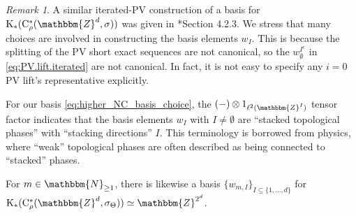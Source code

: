 \documentclass{amsart}
\numberwithin{figure}{section}
\numberwithin{equation}{section}
\numberwithin{table}{section}
\theoremstyle{plain}
\theoremstyle{definition}
\theoremstyle{remark}
\newtheorem{remark}[equation]{Remark}
\theoremstyle{nonumber}
\newcommand{\N}{\mathbb{N}}
\newcommand{\Z}{\mathbb{Z}}
\newcommand{\K}{\relax\ifmmode\operatorname{K}\else\textup{K}\fi}
\newcommand{\Cst}{\relax\ifmmode\mathrm{C}^*\else\textup{C*}\fi}
\newcommand{\Cstr}{\Cst_\rho} %
\newcommand{\blank}{-}
\renewcommand{\mathbb}{\mathbbm} %
\begin{document}
\begin{remark}
A similar iterated-PV construction of a basis for
$\K_*(\Cstr(\Z^d,\sigma))$ was given in
\cite{Prodan-SBaldes:Complex_topological_insulators}*{Section 4.2.3}. We stress that many choices are involved in constructing the basis elements $w_I$. This is because the splitting of the PV short exact sequences are not canonical, so the $w_\emptyset^{I^\mathrm{c}}$ in \eqref{eq:PV.lift.iterated} are not canonical. In fact, it is not easy to specify any $i=0$ PV lift's representative explicitly.

For our basis \eqref{eq:higher_NC_basis_choice}, the $(\blank)\otimes
1_{\ell^2(\Z^I)}$ tensor factor indicates that the basis elements $w_I$
with $I\neq \emptyset$ are ``stacked topological phases'' with ``stacking
directions'' $I$. This terminology is borrowed from physics, where ``weak''
topological phases are often described as being connected to ``stacked''
phases.
\end{remark}


For $m\in\N_{\geq 1}$, there is likewise a basis $\{w_{m,I}\}_{I\subseteq\{1,\ldots,d\}}$ for $\K_*(\Cstr(\Z^d,\sigma_\Theta))\simeq \Z^{2^d}$.
\end{document}
